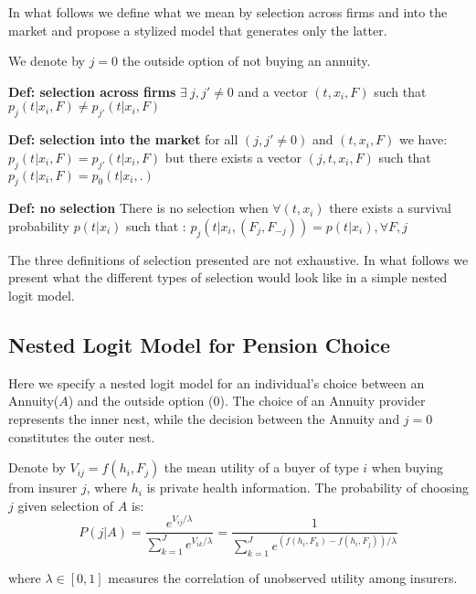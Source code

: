 \documentclass[12pt]{article}
\theoremstyle{plain}
\theoremstyle{plain}
\begin{document}
In what follows we define what we mean by selection across firms and into the market and propose a stylized model that generates only the latter. 

We denote by $j=0$ the outside option of not buying an annuity. 

\textbf{Def: selection across firms} 
  $\exists \ j,j'\neq 0$ and a vector $(t,x_{i},F)$ such that  $p_j(t|x_{i}, F) \neq p_{j'}(t|x_{i}, F)$

\textbf{Def: selection into the market} 
for all $(j,j'\neq 0 )$ and $(t,x_{i},F)$ we have: 
$p_j(t|x_{i}, F) = p_{j'}(t|x_{i}, F)$ but there exists a vector $(j, t,x_{i},F)$ such that $p_j(t|x_{i}, F) = p_{0}(t|x_{i}, .)$


\textbf{Def: no selection} 
There is no selection  when $\forall (t,x_{i}) $ there exists a 
survival probability $p(t|x_{i})$ such that :   $p_j(t|x_{i}, (F_j, F_{-j})) = p(t|x_{i}), \forall F,j $



\smallskip

The three definitions of selection presented are not exhaustive. In what follows we present what the different types of selection would look like in a simple nested logit model. 

\medskip






\subsection*{Nested Logit Model for Pension Choice}

Here we specify a nested logit model for an individual's choice between an Annuity($A$) and the outside option ($0$). The choice of an Annuity provider represents the inner nest, while the  decision between the Annuity and $j=0$ constitutes the outer nest.


Denote by $V_{ij} = f(h_i, F_j)$ the mean utility of a buyer of type $i$ when buying from insurer $j$, where $h_i$ is private health information. The probability of choosing $j$ given selection of $A$ is: 
\begin{equation}\label{eq:inner_prob}
    P(j|A) = \frac{e^{V_{ij} / \lambda}}{\sum_{k=1}^{J} e^{V_{ik} / \lambda}} = \frac{1}{\sum_{k=1}^{J} e^{(f(h_i, F_k)-f(h_i, F_j)) / \lambda}}
\end{equation}

where $\lambda\in[0,1]$ measures the correlation of unobserved utility among insurers. 
\end{document}
